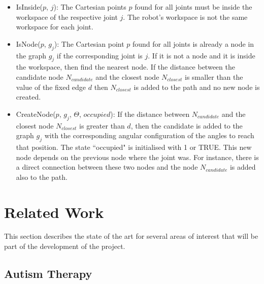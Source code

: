 \documentclass[thesis]{mas_proposal}
\begin{document}
\begin{itemize}
\begin{itemize}
		 	\item IsInside($p$, $j$): The Cartesian points $p$ found for all joints must be inside the workspace of the respective joint $j$. The robot's workspace is not the same workspace for each joint.
		 	\item IsNode($p$, $g_j$): The Cartesian point $p$ found for all joints is already a node in the graph $g_j$ if the corresponding joint is $j$. If it is not a node and it is inside the workspace, then find the nearest node. If the distance between the candidate node $N_{candidate}$ and the closest node $N_{closest}$ is smaller than the value of the fixed edge $d$ then $N_{closest}$ is added to the path and no new node is created.
		 	\item CreateNode($p$, $g_j$, $\Theta$, $occupied$): If the distance between $N_{candidate}$ and the closest node $N_{closest}$ is greater than $d$, then the candidate is added to the graph $g_j$ with the corresponding angular configuration of the angles to reach that position. The state ``occupied" is initialised with 1 or TRUE. This new node depends on the previous node where the joint was. For instance, there is a direct connection between these two nodes and the node $N_{candidate}$ is added also to the path.
		 	
		 \end{itemize} 
	\end{itemize}    

\section{Related Work}
	
		This section describes the state of the art for several areas of interest that will be part of the development of the project.
		
	\subsection{Autism Therapy}
	
\end{document}
